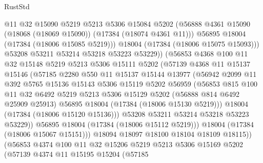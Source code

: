 \begin{lexlean}{RustStd}
\begin{coremodule}
                    @11
                    @32
                    @15090
                    @5219
                    @5213
                    @5306
                    @15084
                    @5202
                    (@56888 @4361 @15090 (@18068 (@18069 @15090)) (@17384 (@18074 @4361 @11)))
                    @56895
                    @18004
                    (@17384 (@18006 @15085 @5219)))
                  @18004
                  (@17384 (@18006 @15075 @15093)))
                @53208
                @53211
                @53214
                @53218
                @53223
                @53229))
            (@56853
              @4368
              @100
              @11
              @32
              @15148
              @5219
              @5213
              @5306
              @15111
              @5202
              (@57139
                @4368
                @11
                @15137
                @15146
                (@57185
                  @2280
                  @550
                  @11
                  @15137
                  @15144
                  @13977
                  (@56942
                    @2099
                    @11
                    @392
                    @5765
                    @15136
                    @15143
                    @5306
                    @15119
                    @5202
                    @56959
                    (@56853
                      @815
                      @100
                      @11
                      @32
                      @6492
                      @5219
                      @5213
                      @5306
                      @15129
                      @5202
                      (@56888 @814 @6492 @25909 @25913)
                      @56895
                      @18004
                      (@17384 (@18006 @15130 @5219)))
                    @18004
                    (@17384 (@18006 @15120 @15136)))
                  @53208
                  @53211
                  @53214
                  @53218
                  @53223
                  @53229))
              @56895
              @18004
              (@17384 (@18006 @15112 @5219)))
            @18004
            (@17384 (@18006 @15067 @15151)))
          @18094
          @18097
          @18100
          @18104
          @18109
          @18115))
      (@56853
        @4374
        @100
        @11
        @32
        @15206
        @5219
        @5213
        @5306
        @15169
        @5202
        (@57139
          @4374
          @11
          @15195
          @15204
          (@57185

\end{coremodule}
\end{lexlean}
